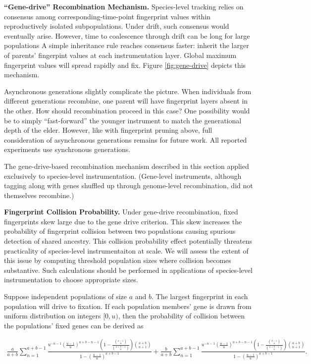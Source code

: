 
\textbf{``Gene-drive'' Recombination Mechanism.}
Species-level tracking relies on consensus among corresponding-time-point fingerprint values within reproductively isolated subpopulations.
Under drift, such consensus would eventually arise.
However, time to coalescence through drift can be long for large populations
A simple inheritance rule reaches consensus faster: inherit the larger of parents' fingerpint values at each instrumentation layer.
Global maximum fingerprint values will spread rapidly and fix.
Figure \ref{fig:gene-drive} depicts this mechanism.

Asynchronous generations slightly complicate the picture.
When individuals from different generations recombine, one parent will have fingerprint layers absent in the other.
How should recombination proceed in this case?
One possibility would be to simply ``fast-forward'' the younger instrument to match the generational depth of the elder.
However, like with fingerprint pruning above, full consideration of asynchronous generations remains for future work.
All reported experiments use synchronous generations.

The gene-drive-based recombination mechanism described in this section applied exclusively to species-level instrumentation.
(Gene-level instruments, although tagging along with genes shuffled up through genome-level recombination, did not themselves recombine.)

\textbf{Fingerprint Collision Probability.}
Under gene-drive recombination, fixed fingerprints skew large due to the gene drive criterion.
This skew increases the probability of fingerprint collision between two populations causing spurious detection of shared ancestry.
This collision probability effect potentially threatens practicality of species-level instrumentaiton at scale.
We will assess the extent of this issue by computing threshold population sizes where collision becomes substantive.
Such calculations should be performed in applications of species-level instrumentation to choose appropriate sizes.

Suppose independent populations of size $a$ and $b$.
The largest fingerprint in each population will drive to fixation.
If each population members' gene is drawn from uniform distribution on integers $[0, u)$, then the probability of collision between the populations' fixed genes can be derived as

\begin{scriptsize}
\begin{align*}
\frac{a}{a + b}\sum_{n=1}^{a + b - 1} \frac{u^{- n - 1} \left(\frac{u - 1}{u}\right)^{a + b - n - 1} \left(1 - \frac{{\binom{a - 1}{n}}}{{\binom{a + b - 1}{n}}} \right) {\binom{a + b}{n + 1}}}{1 - \left(\frac{u - 1}{u}\right)^{a + b - 1}}
+ \frac{b}{a + b} \sum_{n=1}^{a + b - 1} \frac{u^{- n - 1} \left(\frac{u - 1}{u}\right)^{a + b - n - 1} \left(1 - \frac{{\binom{b - 1}{n}}}{{\binom{a + b - 1}{n}}} \right) {\binom{a + b}{n + 1}}}{1 - \left(\frac{u - 1}{u}\right)^{a + b - 1}}.
\end{align*}
\end{scriptsize}

